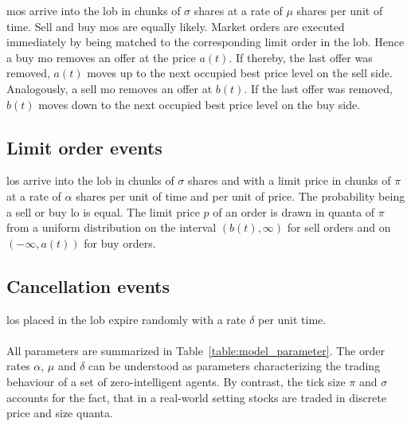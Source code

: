 \documentclass[11pt, a4paper]{thesis}  %
\begin{document}
\acp{mo} arrive into the \ac{lob} in chunks of $\sigma$ shares at a rate of $\mu$ shares per unit of time. Sell and buy \acp{mo} are equally likely. Market orders are executed immediately by being matched to the corresponding limit order in the \ac{lob}. Hence a buy \ac{mo} removes an offer at the price $a(t)$. If thereby, the last offer was removed, $a(t)$ moves up to the next occupied best price level on  the sell side. Analogously, a sell \ac{mo} removes an offer at $b(t)$. If the last offer was removed, $b(t)$ moves down to the next occupied best price level on  the buy side.

\subsection{Limit order events} 

\acp{lo} arrive into the \ac{lob} in chunks of $\sigma$ shares and with a limit price in chunks of $\pi$ at a rate of $\alpha$ shares per unit of time and per unit of price. The probability being a sell or buy \ac{lo} is equal. The limit price $p$ of an order is drawn in quanta of $\pi$ from a uniform distribution on the interval $(b(t), \infty)$ for sell orders and on $(-\infty, a(t))$ for buy orders.

\subsection{Cancellation events} 

\acp{lo} placed in the \ac{lob} expire randomly with a rate $\delta$ per unit time.
\\
\\
\noindent All parameters are summarized in Table~\ref{table:model_parameter}. The order rates $\alpha$, $\mu$ and $\delta$ can be understood as parameters characterizing the trading behaviour of a set of zero-intelligent agents. By contrast, the tick size $\pi$ and $\sigma$ accounts for the fact, that in a real-world setting stocks are traded in discrete price and size quanta. 
%
\end{document}
